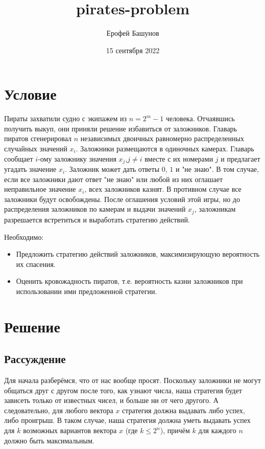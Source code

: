 \documentclass[fontsize=14pt]{article}
\title{pirates-problem}
\author{Ерофей Башунов}
\date{15 сентября 2022}
\begin{document}
\maketitle

\section*{Условие}

Пираты захватили судно с экипажем из $n = 2^m - 1$ человека.
Отчаявшись получить выкуп, они приняли решение избавиться от заложников.
Главарь пиратов сгенерировал $n$ независимых двоичных равномерно распределенных случайных значений $x_i$.
Заложники размещаются в одиночных камерах.
Главарь сообщает $i$-ому заложнику значения $x_j$,$j \neq i$ вместе с их номерами $j$ и предлагает угадать значение $x_i$.
Заложник может дать ответы $0$, $1$ и "не знаю".
В том случае, если все заложники дают ответ "не знаю" или любой из них оглашает неправильное значение $x_i$, всех заложников казнят.
В противном случае все заложники будут освобождены.
После оглашения условий этой игры, но до распределения заложников по камерам и выдачи значений $x_j$, заложникам разрешается встретиться и выработать стратегию действий.

Необходимо:
\begin{itemize}
    \item Предложить стратегию действий заложников, максимизирующую вероятность их спасения.
    \item Оценить кровожадность пиратов, т.е. вероятность казни заложников при использовании ими предложенной стратегии.
\end{itemize}

\section*{Решение}

\subsection*{Рассуждение}

Для начала разберёмся, что от нас вообще просят. Поскольку заложники не могут общаться друг с другом после того, как узнают числа, наша стратегия будет зависеть только от известных чисел, и больше ни от чего другого. А следовательно, для любого вектора $x$ стратегия должна выдавать либо успех, либо проигрыш. В таком случае, наша стратегия должна уметь выдавать успех для $k$ возможных вариантов вектора $x$ (где $k \leq 2^n$), причём $k$ для каждого $n$ должно быть максимальным.
\end{document}
